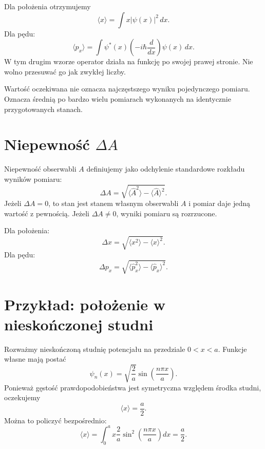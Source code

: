 Dla położenia otrzymujemy
\begin{equation}
    \langle x\rangle=\int x|\psi(x)|^2\,dx.
\end{equation}
Dla pędu:
\begin{equation}
    \langle p_x\rangle
    =\int \psi^*(x)\left(-i\hbar\frac{d}{dx}\right)\psi(x)\,dx.
\end{equation}
W tym drugim wzorze operator działa na funkcję po swojej prawej stronie. Nie wolno przesuwać go jak zwykłej liczby.

\begin{remarkbox}
Wartość oczekiwana nie oznacza najczęstszego wyniku pojedynczego pomiaru. Oznacza średnią po bardzo wielu pomiarach wykonanych na identycznie przygotowanych stanach.
\end{remarkbox}

\section{Niepewność \texorpdfstring{\(\Delta A\)}{Delta A}}

Niepewność obserwabli \(A\) definiujemy jako odchylenie standardowe rozkładu wyników pomiaru:
\begin{equation}
    \Delta A=\sqrt{\langle \hat{A}^2\rangle-\langle \hat{A}\rangle^2}.
\end{equation}
Jeżeli \(\Delta A=0\), to stan jest stanem własnym obserwabli \(A\) i pomiar daje jedną wartość z pewnością. Jeżeli \(\Delta A\neq 0\), wyniki pomiaru są rozrzucone.

Dla położenia:
\begin{equation}
    \Delta x=\sqrt{\langle x^2\rangle-\langle x\rangle^2}.
\end{equation}
Dla pędu:
\begin{equation}
    \Delta p_x=\sqrt{\langle \hat{p}_x^2\rangle-\langle \hat{p}_x\rangle^2}.
\end{equation}

\section{Przykład: położenie w nieskończonej studni}

Rozważmy nieskończoną studnię potencjału na przedziale \(0<x<a\). Funkcje własne mają postać
\begin{equation}
    \psi_n(x)=\sqrt{\frac{2}{a}}\sin\left(\frac{n\pi x}{a}\right).
\end{equation}
Ponieważ gęstość prawdopodobieństwa jest symetryczna względem środka studni, oczekujemy
\begin{equation}
    \langle x\rangle=\frac{a}{2}.
\end{equation}
Można to policzyć bezpośrednio:
\begin{equation}
    \langle x\rangle=\int_0^a x\frac{2}{a}\sin^2\left(\frac{n\pi x}{a}\right)dx=\frac{a}{2}.
\end{equation}

